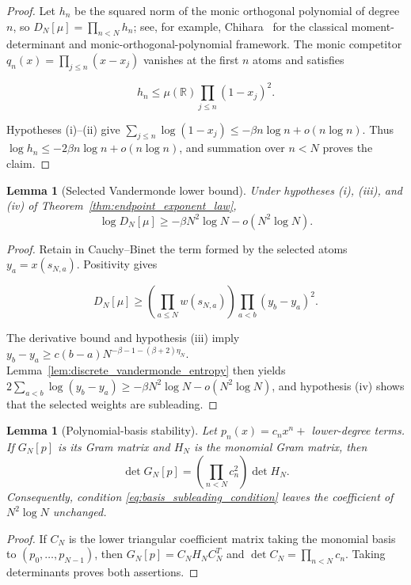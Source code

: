 \documentclass[preprint,12pt]{elsarticle}
\numberwithin{equation}{section}
\theoremstyle{plain}
\newtheorem{lemma}[theorem]{Lemma}
\theoremstyle{definition}
\theoremstyle{remark}
\begin{document}
\begin{proof}
Let \(h_n\) be the squared norm of the monic orthogonal polynomial of degree \(n\), so
\(D_N[\mu]=\prod_{n<N}h_n\); see, for example, Chihara~\cite{Chihara1978} for the
classical moment-determinant and monic-orthogonal-polynomial framework.  The monic competitor
\(q_n(x)=\prod_{j\le n}(x-x_j)\) vanishes at the first \(n\) atoms and satisfies

\[
h_n\le \mu(\mathbb R)\prod_{j\le n}(1-x_j)^2.
\]

Hypotheses \textup{(i)}--\textup{(ii)} give
\(\sum_{j\le n}\log(1-x_j)\le-\beta n\log n+o(n\log n)\).  Thus
\(\log h_n\le-2\beta n\log n+o(n\log n)\), and summation over \(n<N\) proves the
claim.
\end{proof}

\begin{lemma}[Selected Vandermonde lower bound]
\label{lem:endpoint_lower_module}
Under hypotheses \textup{(i)}, \textup{(iii)}, and \textup{(iv)} of
Theorem~\ref{thm:endpoint_exponent_law},
\[
\log D_N[\mu]\ge-\beta N^2\log N-o(N^2\log N).
\]
\end{lemma}

\begin{proof}
Retain in Cauchy--Binet the term formed by the selected atoms
\(y_a=x(s_{N,a})\).  Positivity gives

\[
D_N[\mu]\ge
\left(\prod_{a\le N}w(s_{N,a})\right)
\prod_{a<b}(y_b-y_a)^2.
\]

The derivative bound and hypothesis \textup{(iii)} imply
\(y_b-y_a\ge c(b-a)N^{-\beta-1-(\beta+2)\eta_N}\).
Lemma~\ref{lem:discrete_vandermonde_entropy} then yields
\(2\sum_{a<b}\log(y_b-y_a)\ge-\beta N^2\log N-o(N^2\log N)\), and
hypothesis \textup{(iv)} shows that the selected weights are subleading.
\end{proof}

\begin{lemma}[Polynomial-basis stability]
\label{lem:endpoint_basis_module}
Let \(p_n(x)=c_nx^n+\) lower-degree terms.  If \(G_N[p]\) is its Gram matrix and
\(H_N\) is the monomial Gram matrix, then
\[
\det G_N[p]=\left(\prod_{n<N}c_n^2\right)\det H_N.
\]
Consequently, condition \eqref{eq:basis_subleading_condition} leaves the coefficient of
\(N^2\log N\) unchanged.
\end{lemma}

\begin{proof}
If \(C_N\) is the lower triangular coefficient matrix taking the monomial basis to
\((p_0,\ldots,p_{N-1})\), then \(G_N[p]=C_NH_NC_N^T\) and
\(\det C_N=\prod_{n<N}c_n\).  Taking determinants proves both assertions.
\end{proof}
\end{document}
